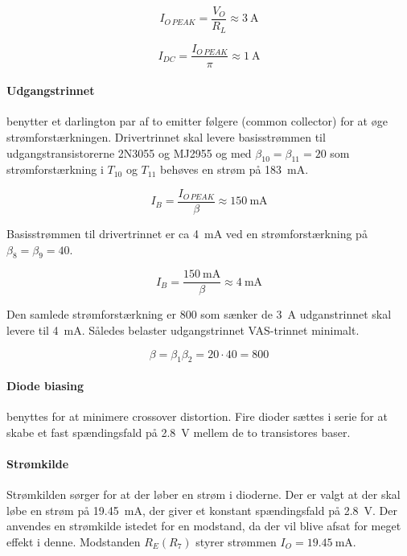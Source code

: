 \documentclass[danish]{article}
\begin{document}
\begin{equation}
I_{O\,PEAK} = \dfrac{V_O}{R_L} \approx \SI{3}{\ampere}
\end{equation}

\begin{equation}
I_{DC} = \dfrac{I_{O\,PEAK}}{\pi} \approx \SI{1}{\ampere}
\end{equation}

\paragraph{Udgangstrinnet} benytter et darlington par af to emitter følgere (common collector) for at øge strømforstærkningen. Drivertrinnet skal levere basisstrømmen til udgangstransistorerne 2N3055 og MJ2955 og med $\beta_{10} = \beta_{11} = 20$ som strømforstærkning i $T_{10}$ og $T_{11}$ behøves en strøm på \SI{183}{\milli\ampere}.

\begin{equation}
I_B = \dfrac{I_{O\,PEAK}}{\beta} \approx \SI{150}{\milli\ampere}
\end{equation}

Basisstrømmen til drivertrinnet er ca \SI{4}{\milli\ampere} ved en strømforstærkning på $\beta_8 = \beta_9 = 40$.

\begin{equation}
I_B = \dfrac{\SI{150}{\milli\ampere}}{\beta} \approx \SI{4}{\milli\ampere}
\end{equation}

Den samlede strømforstærkning er 800 som sænker de \SI{3}{\ampere} udganstrinnet skal levere til \SI{4}{\milli\ampere}. Således belaster udgangstrinnet VAS-trinnet minimalt.

\begin{equation}
\beta = \beta_1 \beta_2 = 20 {\cdot} 40 = 800
\end{equation}

\newpage
\paragraph{Diode biasing} benyttes for at minimere crossover distortion. Fire dioder sættes i serie for at skabe et fast spændingsfald på \SI{2.8}{\volt} mellem de to transistores baser. 

\paragraph{Strømkilde}
Strømkilden sørger for at der løber en strøm i dioderne. 
Der er valgt at der skal løbe en strøm på \SI{19.45}{\milli\ampere}, der giver et konstant spændingsfald på \SI{2.8}{\volt}. 
Der anvendes en strømkilde istedet for en modstand, da der vil blive afsat for meget effekt i denne.
Modstanden $R_E (R_{7})$ styrer strømmen $I_O = \SI{19.45}{\milli\ampere}$. 
\end{document}
